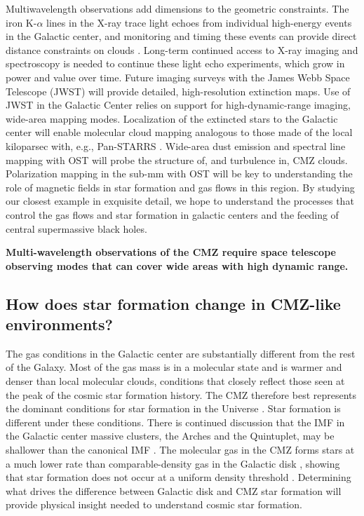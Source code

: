 \documentclass[modern]{aastex62}
\begin{document}
Multiwavelength observations add dimensions to the geometric constraints.
The iron K-$\alpha$ lines in the X-ray trace light echoes from individual
high-energy events in the Galactic center, and monitoring and timing these
events can provide direct distance constraints on clouds
\citep[e.g.,][]{Clavel2014a,Churazov2017b,Churazov2017a,Terrier2018a}.
Long-term continued access to X-ray imaging and spectroscopy is needed to
continue these light echo experiments, which grow in power and value over time.
Future imaging surveys with the James Webb Space Telescope (JWST) will provide
detailed, high-resolution extinction maps.  Use of JWST in the Galactic Center
relies on support for high-dynamic-range imaging, wide-area mapping modes.
Localization of the extincted stars to the Galactic center will enable
molecular cloud mapping analogous to those made of the local kiloparsec with,
e.g., Pan-STARRS \citep{Green2015b}.  Wide-area dust emission and spectral line
mapping with OST will probe the structure of, and turbulence in, CMZ clouds.
Polarization mapping in the sub-mm with OST will be key to understanding the
role of magnetic fields in star formation and gas flows in this region.
By studying our closest example in exquisite detail, we hope to understand the
processes that control the gas flows and star formation in galactic centers and
the feeding of central supermassive black holes.

\textbf{Multi-wavelength observations of the CMZ require space telescope
observing modes that can cover wide areas with high dynamic range.}

\subsection{How does star formation change in CMZ-like environments?}
The gas conditions in the Galactic center are substantially different from the
rest of the Galaxy.  Most of the gas mass is in a molecular state
\citep[][]{Kennicutt2012a,Mills2017a} and is warmer and denser than local
molecular clouds, conditions that closely reflect those seen at the peak of the
cosmic star formation history.  The CMZ therefore best represents the dominant
conditions for star formation in the Universe \citep{Kruijssen2013a}.  Star
formation is different under these conditions.  There is continued discussion
that the IMF in the Galactic center massive clusters, the Arches and the
Quintuplet, may be shallower than the canonical IMF \citep{Hosek2019a}. The
molecular gas in the CMZ forms stars at a much lower rate than
comparable-density gas in the Galactic disk \citep{Longmore2013b}, showing that
star formation does not occur at a uniform density threshold
\citep{Rathborne2014b,Kruijssen2014c,Walker2018a,Barnes2017b,Ginsburg2018a}.
Determining what drives the difference between Galactic disk and CMZ
star formation will provide physical insight needed to understand
cosmic star formation.
\end{document}
